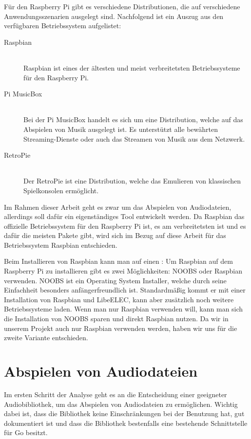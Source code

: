 Für den Raspberry Pi gibt es verschiedene Distributionen, die auf verschiedene
Anwendungsszenarien ausgelegt sind. Nachfolgend ist ein Auszug aus den verfügbaren
Betriebssystem aufgelistet: 
\begin{description}
\item[Raspbian] \hfill \\ 
    Raspbian ist eines der ältesten und meist verbreitetsten Betriebssysteme für
    den Raspberry Pi. 
\item[Pi MusicBox] \hfill \\ 
    Bei der Pi MusicBox handelt es sich um eine Distribution, welche auf das
    Abspielen von Musik ausgelegt ist. Es unterstützt alle bewährten
    Streaming-Dienste oder auch das Streamen von Musik aus dem Netzwerk.
\item[RetroPie] \hfill \\
    Der RetroPie ist eine Distribution, welche das Emulieren von klassischen
    Spielkonsolen ermöglicht.
\end{description}

Im Rahmen dieser Arbeit geht es zwar um das Abspielen von Audiodateien, allerdings
soll dafür ein eigenständiges Tool entwickelt werden. Da Raspbian das
offizielle Betriebssystem für den Raspberry Pi ist, es am verbreitetsten ist
und es dafür die meisten Pakete gibt, wird sich im Bezug auf diese Arbeit für
das Betriebssystem Raspbian entschieden. \autocite{Best_Raspberry_Pi_distros_2019}
\hfill \break

Beim Installieren von Raspbian kann man auf einen :
Um Raspbian auf dem Raspberry Pi zu installieren gibt es zwei Möglichkeiten:
\ac{NOOBS} oder Raspbian verwenden. \ac{NOOBS} ist ein Operating System
Installer, welche durch seine Einfachheit besonders anfängerfreundlich ist.
Standardmäßig kommt er mit einer Installation von Raspbian und LibeELEC, kann
aber zusätzlich noch weitere Betriebssysteme laden. Wenn man nur Raspbian
verwenden will, kann man sich die Installation von \ac{NOOBS} sparen und direkt
Raspbian nutzen. Da wir in unserem Projekt auch nur Raspbian verwenden werden,
haben wir uns für die zweite Variante entschieden. \autocite{monk_2019}


\section{Abspielen von Audiodateien}
Im ersten Schritt der Analyse geht es an die Entscheidung einer geeigneter Audiobibliothek, um das Abspielen von Audiodateien zu ermöglichen. Wichtig dabei
ist, dass die Bibliothek keine Einschränkungen bei der Benutzung hat, gut
dokumentiert ist und dass die Bibliothek bestenfalls eine bestehende
Schnittstelle für Go besitzt.

